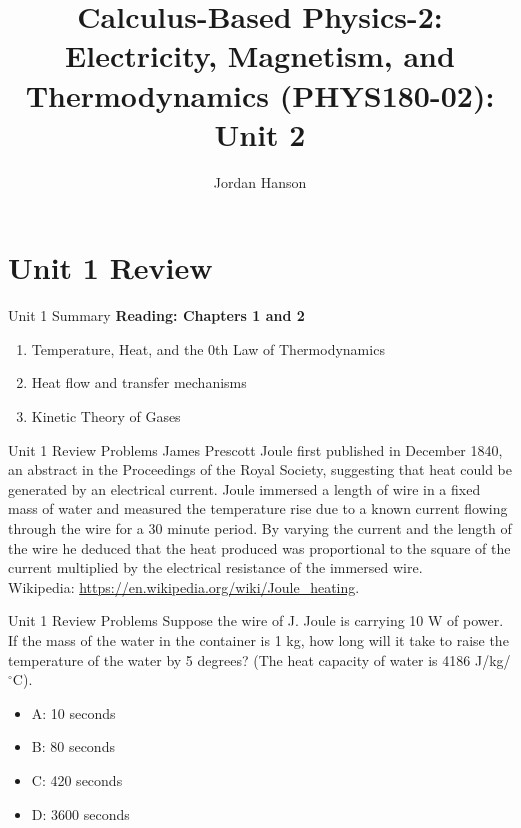 \documentclass{beamer}
\title{Calculus-Based Physics-2: Electricity, Magnetism, and Thermodynamics (PHYS180-02): Unit 2}
\author{Jordan Hanson}
\institute{Whittier College Department of Physics and Astronomy}
\begin{document}
\maketitle

\section{Unit 1 Review}

\begin{frame}{Unit 1 Summary}
\textbf{Reading: Chapters 1 and 2}
\begin{enumerate}
\item Temperature, Heat, and the 0th Law of Thermodynamics
\item Heat flow and transfer mechanisms
\item Kinetic Theory of Gases
\end{enumerate}
\end{frame}

\begin{frame}{Unit 1 Review Problems}
\small
James Prescott Joule first published in December 1840, an abstract in the Proceedings of the Royal Society, suggesting that heat could be generated by an electrical current. Joule immersed a length of wire in a fixed mass of water and measured the temperature rise due to a known current flowing through the wire for a 30 minute period. By varying the current and the length of the wire he deduced that the heat produced was proportional to the square of the current multiplied by the electrical resistance of the immersed wire. \\ \vspace{0.5cm} Wikipedia: \url{https://en.wikipedia.org/wiki/Joule_heating}.
\end{frame}

\begin{frame}{Unit 1 Review Problems}
Suppose the wire of J. Joule is carrying 10 W of power.  If the mass of the water in the container is 1 kg, how long will it take to raise the temperature of the water by 5 degrees?  (The heat capacity of water is 4186 J/kg/$^{\circ}$C).
\begin{itemize}
\item A: 10 seconds
\item B: 80 seconds
\item C: 420 seconds
\item D: 3600 seconds
\end{itemize}
\end{frame}
\end{document}
